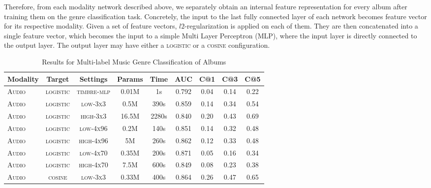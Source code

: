 \documentclass{article}
\begin{document}
Therefore, from each modality network described above, we separately obtain an internal feature representation for every album after training them on the genre classification task.
Concretely, the input to the last fully connected layer of each network becomes feature vector for its respective modality.
Given a set of feature vectors, $l2$-regularization is applied on each of them. 
They are then concatenated into a single feature vector, which becomes the input to a simple Multi Layer Perceptron (MLP), where the input layer is directly connected to the output layer. 
The output layer may have either a \textsc{logistic} or a \textsc{cosine} configuration. 

\begin{table*}[ht]
\centering
\begin{threeparttable}
\scriptsize
\caption{Results for Multi-label Music Genre Classification of Albums}
\label{tbl:results}
\begin{tabular}{lcccccccc}
Modality & Target & Settings                & Params         & Time    & AUC        & C@1           & C@3           & C@5           \\
\toprule
\textsc{Audio} & \textsc{logistic} & \textsc{timbre-mlp}                   &  0.01M              & 1s              & 0.792               & 0.04             & 0.14              & 0.22        \\
\textsc{Audio} & \textsc{logistic} & \textsc{low-3x3}           & 0.5M           & 390s          & 0.859          & 0.14          & 0.34          & 0.54          \\
\textsc{Audio} & \textsc{logistic} & \textsc{high-3x3}          & 16.5M          & 2280s         & 0.840          & 0.20          & 0.43          & 0.69          \\
\textsc{Audio} & \textsc{logistic} & \textsc{low-4x96}          & 0.2M           & 140s          & 0.851          & 0.14          & 0.32          & 0.48          \\
\textsc{Audio} & \textsc{logistic} & \textsc{high-4x96}         & 5M             & 260s          & 0.862          & 0.12          & 0.33          & 0.48          \\
\textsc{Audio} & \textsc{logistic} & \textsc{low-4x70} & 0.35M & 200s & 0.871 & 0.05 & 0.16 & 0.34 \\
\textsc{Audio} & \textsc{logistic} & \textsc{high-4x70}         & 7.5M           & 600s          & 0.849          & 0.08          & 0.23          & 0.38          \\
\textsc{Audio} & \textsc{cosine} & \textsc{low-3x3}            & 0.33M          & 400s          & 0.864          & 0.26          & 0.47          & 0.65          \\

\end{tabular}
\end{threeparttable}
\end{table*}
\end{document}
